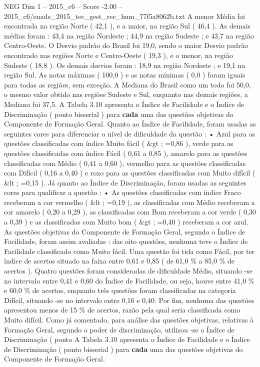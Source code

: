 \begin{textsample}{NEG Dim 1 – 2015\_c6 – Score -2.00 – 2015\_c6/enade\_2015\_tec\_gest\_rec\_hum\_77f5a8062b.txt}
A menor Média foi encontrada na região Norte ( 42,1 ), e a maior, na região Sul ( 46,4 ).
As demais médias foram : 43,4 na região Nordeste ; 44,9 na região Sudeste ; e 43,7 na região Centro-Oeste.
O Desvio padrão do Brasil foi 19,0, sendo o maior Desvio padrão encontrado nas regiões Norte e Centro-Oeste ( 19,3 ), e o menor, na região Sudeste ( 18,8 ).
Os demais desvios foram : 18,9 na região Nordeste ; e 19,1 na região Sul.
As notas máximas ( 100,0 ) e as notas mínimas ( 0,0 ) foram iguais para todas as regiões, sem exceção.
A Mediana do Brasil como um todo foi 50,0, o mesmo valor obtido nas regiões Sudeste e Sul, enquanto nas demais regiões, a Mediana foi 37,5.
A Tabela 3.10 apresenta o Índice de Facilidade e o Índice de Discriminação ( ponto bisserial ) para \textbf{cada} uma das questões objetivas do Componente de Formação Geral.
Quanto ao Índice de Facilidade, foram usadas as seguintes cores para diferenciar o nível de dificuldade da questão : • Azul para as questões classificadas com índice Muito fácil ( \&gt ; =0,86 ), verde para as questões classificadas com índice Fácil ( 0,61 a 0,85 ), amarelo para as questões classificadas com Médio ( 0,41 a 0,60 ), vermelho para as questões classificadas com Difícil ( 0,16 a 0,40 ) e roxo para as questões classificadas com Muito difícil ( \&lt ; =0,15 ).
Já quanto ao Índice de Discriminação, foram usadas as seguintes cores para qualificar a questão : • As questões classificadas com índice Fraco receberam a cor vermelho ( \&lt ; =0,19 ), as classificadas com Médio receberam a cor amarelo ( 0,20 a 0,29 ), as classificadas com Bom receberam a cor verde ( 0,30 a 0,39 ) e as classificadas com Muito bom ( \&gt ; =0,40 ) receberam a cor azul.
As questões objetivas do Componente de Formação Geral, segundo o Índice de Facilidade, foram assim avaliadas : das oito questões, nenhuma teve o Índice de Facilidade classificado como Muito fácil.
Uma questão foi tida como Fácil, por ter índice de acertos situado na faixa entre 0,61 e 0,85 ( de 61,0 \% a 85,0 \% de acertos ).
Quatro questões foram consideradas de dificuldade Médio, situando -se no intervalo entre 0,41 e 0,60 do Índice de Facilidade, ou seja, houve entre 41,0 \% e 60,0 \% de acertos, enquanto três questões foram classificadas na categoria Difícil, situando -se no intervalo entre 0,16 e 0,40.
Por fim, nenhuma das questões apresentou menos de 15 \% de acertos, razão pela qual seria classificada como Muito difícil.
Como já comentado, para análise das questões objetivas, relativas à Formação Geral, segundo o poder de discriminação, utilizou -se o Índice de Discriminação ( ponto A Tabela 3.10 apresenta o Índice de Facilidade e o Índice de Discriminação ( ponto bisserial ) para \textbf{cada} uma das questões objetivas do Componente de Formação Geral.

\end{textsample}
